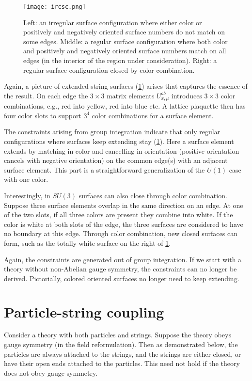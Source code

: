 \documentclass[12pt]{article}
\theoremstyle{definition}
\begin{document}
\begin{figure}%
    \centering
    \texttt{[image: ircsc.png]}
    \caption{Left: an irregular surface configuration where either color or positively and negatively oriented surface numbers do not match on some edges. Middle: a regular surface configuration where both color and positively and negatively oriented surface numbers match on all edges (in the interior of the region under consideration). Right: a regular surface configuration closed by color combination.}
    \label{fig:ircsc}
\end{figure} 

Again, a picture of extended string surfaces  (\cref{fig:ircsc}) arises that captures the essence of the result. On each edge the $3\times 3$ matrix elements $U_{x,\mu}^{ab}$ introduces $3\times 3$ color combinations, e.g., red into yellow, red into blue etc. A lattice plaquette then has four color slots to support $3^4$ color combinations for a surface element. 

The constraints arising from group integration indicate that only regular configurations where surfaces keep extending stay (\cref{fig:ircsc}). Here a surface element extends by matching in color and cancelling in orientation (positive orientation cancels with negative orientation) on the common edge(s) with an adjacent surface element. This part is a straightforward generalization of the $U(1)$ case with one color. 

Interestingly, in $SU(3)$ surfaces can also close through color combination. Suppose three surface elements overlap in the same direction on an edge. At one of the two slots, if all three colors are present they combine into white. If the color is white at both slots of the edge, the three surfaces are considered to have no boundary at this edge. Through color combination, new closed surfaces can form, such as the totally white surface on the right of \cref{fig:ircsc}.

Again, the constraints are generated out of group integration. If we start with a theory without non-Abelian gauge symmetry, the constraints can no longer be derived. Pictorially, colored oriented surfaces no longer need to keep extending.

\section{Particle-string coupling}\label{sec:psc}

Consider a theory with both particles and strings. Suppose the theory obeys gauge symmetry (in the field reformulation). Then as demonstrated below, the particles are always attached to the strings, and the strings are either closed, or have their open ends attached to the particles. This need not hold if the theory does not obey gauge symmetry. 
\end{document}
